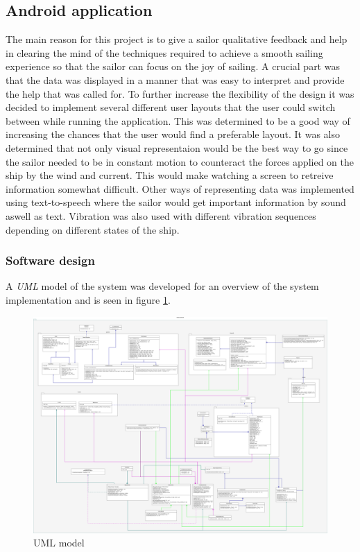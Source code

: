 \subsection{Android application}
The main reason for this project is to give a sailor qualitative feedback and help in clearing the mind of the techniques required to achieve a smooth sailing experience so that the sailor can focus on the joy of sailing. A crucial part was that the data was displayed in a manner that was easy to interpret and provide the help that was called for. To further increase the flexibility of the design it was decided to implement several different user layouts that the user could switch between while running the application. This was determined to be a good way of increasing the chances that the user would find a preferable layout. It was also determined that not only visual representaion would be the best way to go since the sailor needed to be in constant motion to counteract the forces applied on the ship by the wind and current. This would make watching a screen to retreive information somewhat difficult. Other ways of representing data was implemented using text-to-speech where the sailor would get important information by sound aswell as text. Vibration was also used with different vibration sequences depending on different states of the ship.

\subsubsection{Software design}
A \textit{UML}\cite{uml} model of the system was developed for an overview of the system implementation and is seen in figure \ref{android-uml}. 
\begin{figure}[H]
\centering
\includegraphics[width=1\textwidth]{Figures/uml.png}
\caption{UML model}
\label{android-uml}
\end{figure}

